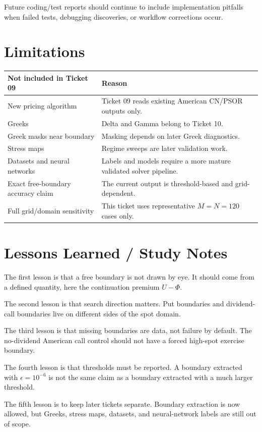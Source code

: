 \documentclass[11pt,a4paper]{article}
\begin{document}
Future coding/test reports should continue to include implementation pitfalls when failed tests,
debugging discoveries, or workflow corrections occur.

\section{Limitations}

\begin{longtable}{L{0.34\textwidth}L{0.54\textwidth}}
\toprule
Not included in Ticket 09 & Reason \\
\midrule
\endhead
New pricing algorithm & Ticket 09 reads existing American CN/PSOR outputs only. \\
Greeks & Delta and Gamma belong to Ticket 10. \\
Greek masks near boundary & Masking depends on later Greek diagnostics. \\
Stress maps & Regime sweeps are later validation work. \\
Datasets and neural networks & Labels and models require a more mature validated solver pipeline. \\
Exact free-boundary accuracy claim & The current output is threshold-based and grid-dependent. \\
Full grid/domain sensitivity & This ticket uses representative \(M=N=120\) cases only. \\
\bottomrule
\end{longtable}

\section{Lessons Learned / Study Notes}

The first lesson is that a free boundary is not drawn by eye. It should come from a defined
quantity, here the continuation premium \(U-\Phi\).

The second lesson is that search direction matters. Put boundaries and dividend-call boundaries
live on different sides of the spot domain.

The third lesson is that missing boundaries are data, not failure by default. The no-dividend
American call control should not have a forced high-spot exercise boundary.

The fourth lesson is that thresholds must be reported. A boundary extracted with \(\epsilon=10^{-6}\)
is not the same claim as a boundary extracted with a much larger threshold.

The fifth lesson is to keep later tickets separate. Boundary extraction is now allowed, but Greeks,
stress maps, datasets, and neural-network labels are still out of scope.
\end{document}
